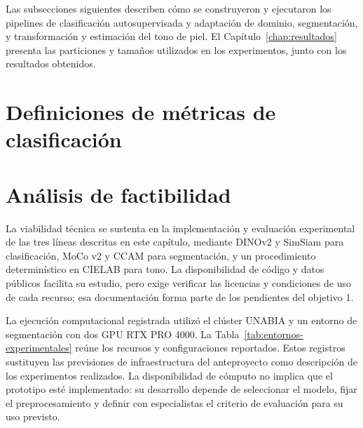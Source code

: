 \endgroup
{\footnotesize\singlespacing
\par{}
}

Las subsecciones siguientes describen cómo se construyeron y ejecutaron los pipelines de clasificación autosupervisada y adaptación de dominio, segmentación, y transformación y estimación del tono de piel. El Capítulo~\ref{chap:resultados} presenta las particiones y tamaños utilizados en los experimentos, junto con los resultados obtenidos.

\section{Definiciones de métricas de clasificación}
\label{sec:metricas-evaluacion}




\section{Análisis de factibilidad}

La viabilidad técnica se sustenta en la implementación y evaluación experimental de las tres líneas descritas en este capítulo, mediante DINOv2 y SimSiam para clasificación, MoCo v2 y CCAM para segmentación, y un procedimiento determinístico en CIELAB para tono. La disponibilidad de código y datos públicos facilita su estudio, pero exige verificar las licencias y condiciones de uso de cada recurso; esa documentación forma parte de los pendientes del objetivo 1.

La ejecución computacional registrada utilizó el clúster UNABIA y un entorno de segmentación con dos GPU RTX PRO 4000. La Tabla~\ref{tab:entornos-experimentales} reúne los recursos y configuraciones reportados. Estos registros sustituyen las previsiones de infraestructura del anteproyecto como descripción de los experimentos realizados. La disponibilidad de cómputo no implica que el prototipo esté implementado: su desarrollo depende de seleccionar el modelo, fijar el preprocesamiento y definir con especialistas el criterio de evaluación para su uso previsto.

